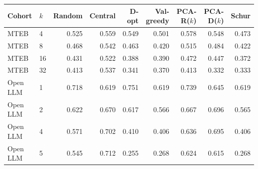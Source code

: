 \begin{tabular}{llrrrrrrr}
\toprule Cohort & $k$ & Random & Central & D-opt & Val-greedy & PCA-R($k$) & PCA-D($k$) & Schur\\\midrule
MTEB & 4 & 0.525 & 0.559 & 0.549 & 0.501 & 0.578 & 0.548 & 0.473\\
MTEB & 8 & 0.468 & 0.542 & 0.463 & 0.420 & 0.515 & 0.484 & 0.422\\
MTEB & 16 & 0.431 & 0.522 & 0.388 & 0.390 & 0.472 & 0.447 & 0.372\\
MTEB & 32 & 0.413 & 0.537 & 0.341 & 0.370 & 0.413 & 0.332 & 0.333\\
Open LLM & 1 & 0.718 & 0.619 & 0.751 & 0.619 & 0.739 & 0.645 & 0.619\\
Open LLM & 2 & 0.622 & 0.670 & 0.617 & 0.566 & 0.667 & 0.696 & 0.565\\
Open LLM & 4 & 0.571 & 0.702 & 0.410 & 0.406 & 0.636 & 0.695 & 0.406\\
Open LLM & 5 & 0.545 & 0.712 & 0.255 & 0.268 & 0.624 & 0.615 & 0.268\\
\bottomrule\end{tabular}